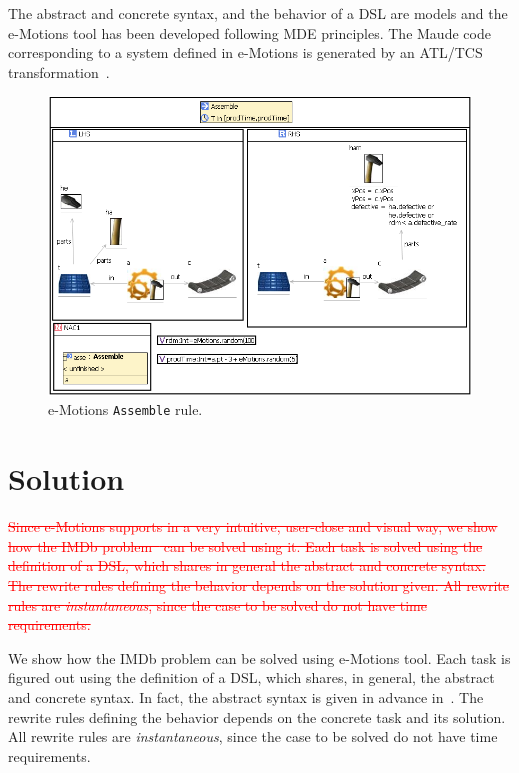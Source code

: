 \documentclass[draft]{llncs}
\newcommand{\delete}[1]{\textcolor{red}{\sout{#1}}}
\newcommand{\delete}[1]{}
\newcommand{\code}[1]{{\texttt{#1}}}
\begin{document}
The abstract and concrete syntax, and the behavior of a DSL are models and the e-Motions tool has been developed following MDE principles. The Maude code corresponding to a system defined in e-Motions is generated by an ATL/TCS transformation~\cite{atl}.

\begin{figure}[htp]
  \centering
  \includegraphics[width=\textwidth]{imgs/assemble}
  \caption{e-Motions \code{Assemble} rule.}\label{fig:assemble}
\end{figure}

\section{Solution}\label{sec:solution}

\delete{Since e-Motions supports in a very intuitive, user-close and visual way, we show how the IMDb problem~\cite{imdbcase} can be solved using it. Each task is solved using the definition of a DSL, which shares in general the abstract and concrete syntax. The rewrite rules defining the behavior depends on the solution given. All rewrite rules are \textit{instantaneous}, since the case to be solved do not have time requirements.}

We show how the IMDb problem can be solved using e-Motions tool. Each task is figured out using the definition of a DSL, which shares, in general, the abstract and concrete syntax. In fact, the abstract syntax is given in advance in~\cite{imdbsources}. The rewrite rules defining the behavior depends on the concrete task and its solution. All rewrite rules are \textit{instantaneous}, since the case to be solved do not have time requirements.
\end{document}
